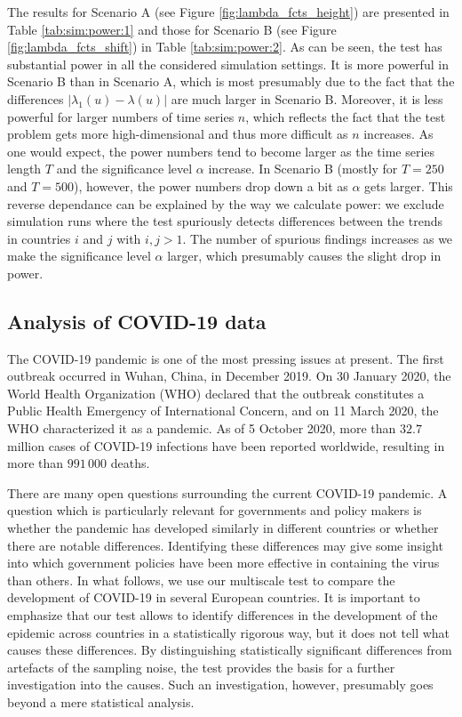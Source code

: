 \documentclass[a4paper,12pt]{article}
\numberwithin{equation}{section}
\begin{document}
The results for Scenario A (see Figure \ref{fig:lambda_fcts_height}) are presented in Table \ref{tab:sim:power:1} and those for Scenario B (see Figure \ref{fig:lambda_fcts_shift}) in Table \ref{tab:sim:power:2}. As can be seen, the test has substantial power in all the considered simulation settings. It is more powerful in Scenario B than in Scenario A, which is most presumably due to the fact that the differences $|\lambda_1(u) - \lambda(u)|$ are much larger in Scenario B. Moreover, it is less powerful for larger numbers of time series $n$, which reflects the fact that the test problem gets more high-dimensional and thus more difficult as $n$ increases. As one would expect, the power numbers tend to become larger as the time series length $T$ and the significance level $\alpha$ increase. In Scenario B (mostly for $T=250$ and $T=500$), however, the power numbers drop down a bit as $\alpha$ gets larger. This reverse dependance can be explained by the way we calculate power: we exclude simulation runs where the test spuriously detects differences between the trends in countries $i$ and $j$ with $i, j > 1$. The number of spurious findings increases as we make the significance level $\alpha$ larger, which presumably causes the slight drop in power.


\subsection{Analysis of COVID-19 data}\label{subsec:app}


The COVID-19 pandemic is one of the most pressing issues at present. The first outbreak occurred in Wuhan, China, in December 2019. On 30 January 2020, the World Health Organization (WHO) declared that the outbreak constitutes a Public Health Emergency of International Concern, and on 11 March 2020, the WHO characterized it as a pandemic. As of 5 October 2020, more than $32.7$ million cases of COVID-19 infections have been reported worldwide, resulting in more than $991\,000$ deaths.


There are many open questions surrounding the current COVID-19 pandemic. A question which is particularly relevant for governments and policy makers is whether the pandemic has developed similarly in different countries or whether there are notable differences. Identifying these differences may give some insight into which government policies have been more effective in containing the virus than others. In what follows, we use our multiscale test to compare the development of COVID-19 in several European countries. It is important to emphasize that our test allows to identify differences in the development of the epidemic across countries in a statistically rigorous way, but it does not tell what causes these differences. By distinguishing statistically significant differences from artefacts of the sampling noise, the test provides the basis for a further investigation into the causes. Such an investigation, however, presumably goes beyond a mere statistical analysis. 
\end{document}
